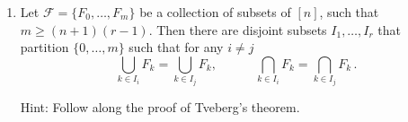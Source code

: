 \documentclass[kulak]{tplt}
\theoremstyle{definition}
\newcommand{\FF}{\mathcal F}
\begin{document}
\begin{enumerate}
\item Let $\FF = \{ F_0, \ldots, F_m\}$ be a collection of subsets of $[n]$, such that $m \geq (n+1)(r-1)$.
Then there are disjoint subsets $I_1, \ldots , I_r$ that partition $\{0, \ldots, m\}$ such that for any $i\neq j$
$$ \bigcup_{k \in I_i} F_k = \bigcup_{k \in I_j} F_k , \quad \quad \quad \bigcap_{k \in I_i} F_k = \bigcap_{k \in I_j} F_k \, .$$

Hint: Follow along the proof of Tveberg's theorem.

\end{enumerate}
\end{document}
